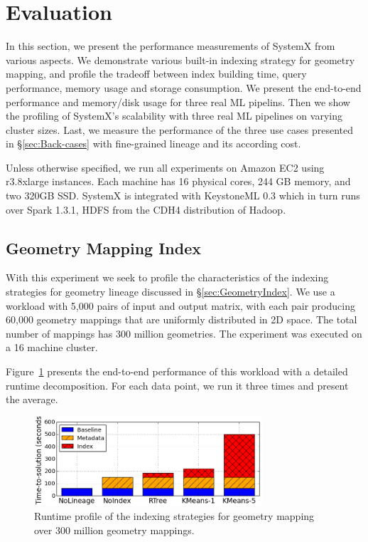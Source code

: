 \documentclass{sig-alternate}
\begin{document}
\section{Evaluation}
\label{sec:Perf}
In this section, we present the performance measurements of SystemX from various aspects.
We demonstrate various built-in indexing strategy for geometry mapping, and profile the tradeoff
between index building time, query performance, memory usage and storage consumption.
We present the end-to-end performance and memory/disk usage for three real ML pipelins.
Then we show the profiling of SystemX's scalability with three real ML pipelines on varying cluster sizes.
Last, we measure the performance of the three use cases presented in \S\ref{sec:Back-cases} with 
fine-grained lineage and its according cost.

Unless otherwise specified, we run all experiments on Amazon EC2 using r3.8xlarge instances.
Each machine has 16 physical cores, 244 GB memory, and two 320GB SSD. 
SystemX is integrated with KeystoneML 0.3 which in turn runs over Spark 1.3.1, HDFS from the
CDH4 distribution of Hadoop. 

\subsection{Geometry Mapping Index}
\label{sec:Perf-Index}
With this experiment we seek to profile the characteristics of the indexing strategies for geometry lineage discussed in \S\ref{sec:GeometryIndex}.
We use a workload with 5,000 pairs of input and output matrix, with each pair producing 60,000 geometry mappings that are uniformly distributed
in 2D space. The total number of mappings has 300 million geometries. The experiment was executed on a 16 machine cluster.

Figure~\ref{fig:sift-time} presents the end-to-end performance of this workload with a detailed runtime decomposition. For each data point, 
we run it three times and present the average. 

\begin{figure}[h]
\begin{center}
    \includegraphics[width=85mm]{pictures/SIFTIndex-Time}
\caption {Runtime profile of the indexing strategies for geometry mapping over 300 million geometry mappings.
    \label{fig:sift-time}
}
\end{center}
\end{figure}
\end{document}
